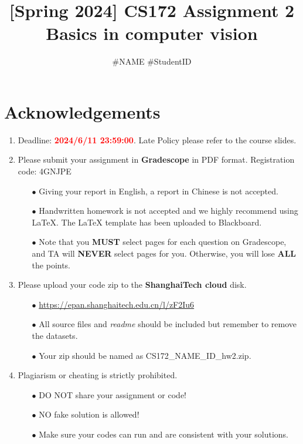 \documentclass[]{article}
\title{\textbf{[Spring 2024] CS172 Assignment 2\\
Basics in computer vision}}
\author{\#NAME \#StudentID}
\begin{document}
\maketitle

\section*{Acknowledgements}
\begin{enumerate} 
    \item Deadline: \textcolor{red}{\textbf{2024/6/11 23:59:00}}. Late Policy please refer to the course slides.
    
    \item Please submit your assignment in \textbf{Gradescope} in PDF format.  Registration code: 4GNJPE
    \begin{itemize}
        \item[$\bullet$] Giving your report in English, a report in Chinese is not accepted.
        \item[$\bullet$] Handwritten homework is not accepted and we highly recommend using LaTeX. The LaTeX template has been uploaded to Blackboard.
        \item[$\bullet$] Note that you \textbf{MUST} select pages for each question on Gradescope, and TA will \textbf{NEVER} select pages for you. Otherwise, you will lose \textbf{ALL} the points.
    \end{itemize}

    
    \item Please upload your code zip to the \textbf{ShanghaiTech cloud} disk.
    \begin{itemize}
        \item[$\bullet$] \small{\url{https://epan.shanghaitech.edu.cn/l/zF2Iu6}}
        \item[$\bullet$] All source files and \textit{readme} should be included but remember to remove the datasets.
        \item[$\bullet$] Your zip should be named as CS172\_NAME\_ID\_hw2.zip.
    \end{itemize}
    
    
    \item Plagiarism or cheating is strictly prohibited. 
    \begin{itemize}
        \item[$\bullet$] DO NOT share your assignment or code!
        \item[$\bullet$] NO fake solution is allowed!
        \item[$\bullet$] Make sure your codes can run and are consistent with your solutions.
    \end{itemize}
    
    
\end{enumerate}
\end{document}
